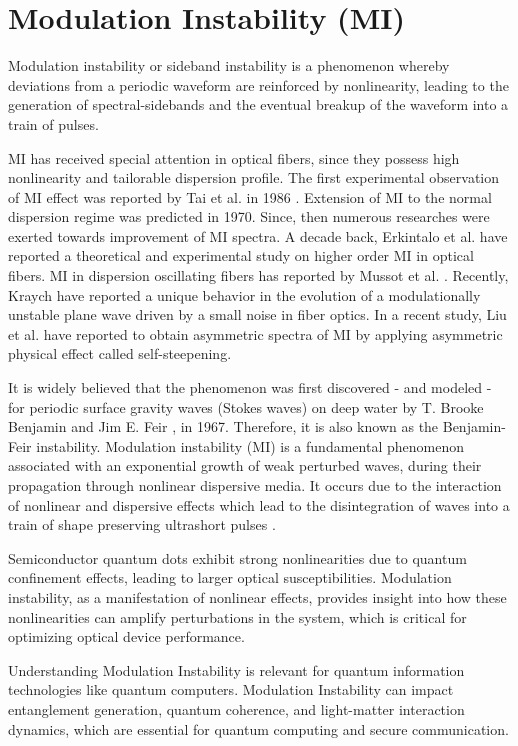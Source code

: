 \documentclass[12pt,a4paper]{article}
\begin{document}
\section{Modulation Instability (MI)}
Modulation instability or sideband instability is a phenomenon whereby deviations from a periodic waveform are reinforced by nonlinearity, leading to the generation of spectral-sidebands and the eventual breakup of the waveform into a train of pulses.\par
MI has received special attention in optical fibers, since they possess high nonlinearity and tailorable dispersion profile. The first experimental observation of MI effect was reported by Tai et al. in 1986 \cite{tai1986generation}. Extension of MI to the normal dispersion regime was predicted in 1970. Since, then numerous researches were exerted towards improvement of MI spectra. A decade back, Erkintalo et al. \cite{erkintalo2011higher} have reported a theoretical and experimental study on higher order MI in optical fibers. MI in dispersion oscillating fibers has reported by Mussot et al. \cite{mussot2017modulation}. Recently, Kraych \cite{kraych2019nonlinear} have reported a unique behavior in the evolution of a modulationally unstable plane wave driven by a small noise in fiber optics. In a recent study, Liu et al. \cite{liu2021exact} have reported to obtain asymmetric spectra of MI by applying asymmetric physical effect called self-steepening.\par
It is widely believed that the phenomenon was first discovered - and modeled - for periodic surface gravity waves (Stokes waves) on deep water by T. Brooke Benjamin and Jim E. Feir \cite{Benjamin_Feir_1967}, in 1967. Therefore, it is also known as the Benjamin-Feir instability. Modulation instability (MI) is a fundamental phenomenon associated with an exponential growth of weak perturbed waves, during their propagation through nonlinear dispersive media. It occurs due to the interaction of nonlinear and dispersive effects which lead to the disintegration of waves into a train of shape preserving ultrashort pulses \cite{MANUKURE2021100140}.\par
Semiconductor quantum dots exhibit strong nonlinearities \cite{Scully_Zubairy_1997} due to quantum confinement effects, leading to larger optical susceptibilities. Modulation instability, as a manifestation of nonlinear effects, provides insight into how these nonlinearities can amplify perturbations in the system, which is critical for optimizing optical device performance.\par
Understanding Modulation Instability is relevant for quantum information technologies like quantum computers. Modulation Instability can impact entanglement generation, quantum coherence, and light-matter interaction dynamics, which are essential for quantum computing and secure communication.
\end{document}
